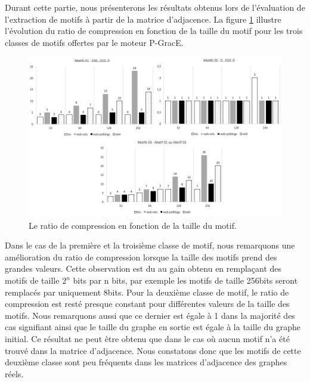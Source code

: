 	Durant cette partie, nous présenterons les résultats obtenus lors de l'évaluation de l'extraction de motifs à partir de la matrice d'adjacence. La figure \ref{fig:test-m} illustre l'évolution du ratio de compression en fonction de la taille du motif pour les trois classes de motifs offertes par le moteur P-GracE.
		\begin{figure}[H]
		\begin{center}
		
			\includegraphics[scale=0.55]{ressources/image/m12.png}
			
			
			
			\caption{Le ratio de compression en fonction de la taille du motif.}
			\label{fig:test-m}
		\end{center}
	\end{figure}
	
	Dans le cas de la première et la troisième classe de motif, nous remarquons une amélioration du ratio de compression lorsque la taille des motifs prend des grandes valeurs. Cette observation est du au gain obtenu en remplaçant des motifs de taille $2^n$ bits par n bits, par exemple les motifs de taille 256bits seront remplacés par uniquement 8bits. Pour la deuxième classe de motif, le ratio de compression est resté presque constant pour différentes valeurs de la taille des motifs. Nous remarquons aussi que ce dernier est égale à 1 dans la majorité des cas signifiant ainsi que le taille du graphe en sortie est égale à la taille du graphe initial. Ce résultat ne peut être obtenu que dans le cas où aucun motif n'a été trouvé dans la matrice d'adjacence. Nous constatons donc que les motifs de cette deuxième classe sont peu fréquents dans les matrices d'adjacence des graphes réels. 
	
